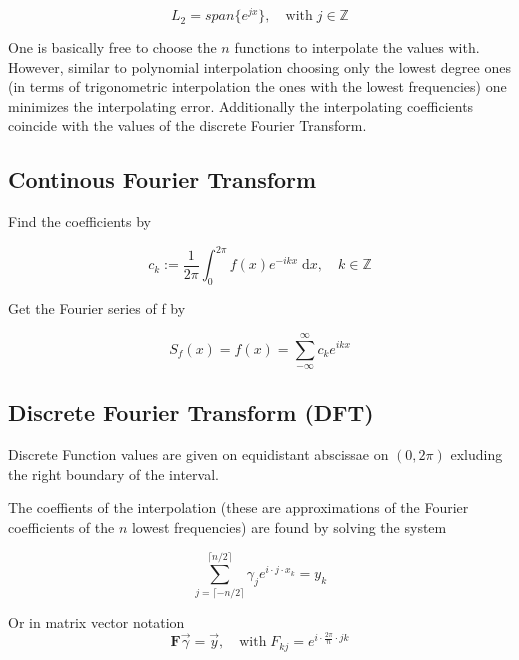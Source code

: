 \documentclass[
    a4paper,
    11pt
]{article}
\begin{document}
\begin{equation}
    L_2 = span \{e^{jx} \}, \quad \text{with} \; j \in \mathbb{Z}
\end{equation}

One is basically free to choose the $n$ functions to interpolate the values
with. However, similar to polynomial interpolation choosing only the lowest
degree ones (in terms of trigonometric interpolation the ones with the lowest
frequencies) one minimizes the interpolating error. Additionally the
interpolating coefficients coincide with the values of the discrete Fourier
Transform.

\subsection{Continous Fourier Transform}

Find the coefficients by 

\begin{equation}
    c_k := \frac{1}{2\pi} \int_0^{2\pi} f(x) e^{-ikx} \; \mathrm{d} x, \quad k
    \in \mathbb{Z}
\end{equation}

Get the Fourier series of f by

\begin{equation}
    S_f(x) = f(x) = \sum_{-\infty}^{\infty}c_k e^{ikx}
\end{equation}

\subsection{Discrete Fourier Transform (DFT)}

Discrete Function values are given on equidistant abscissae on $(0, 2\pi)$
exluding the right boundary of the interval.

The coeffients of the interpolation (these are approximations of the Fourier
coefficients of the $n$ lowest frequencies) are found by solving the system

\begin{equation}
    \sum_{j=\lceil -n/2 \rceil}^{\lceil n/2 \rceil} \gamma_j e^{i\cdot j \cdot x_k} = y_k
\end{equation}

Or in matrix vector notation
\begin{equation}
    \mathbf{F} \vec{\gamma} = \vec{y}, \quad \text{with} \; F_{kj} = e^{i\cdot
    \frac{2\pi}{n} \cdot jk}
\end{equation}
\end{document}
